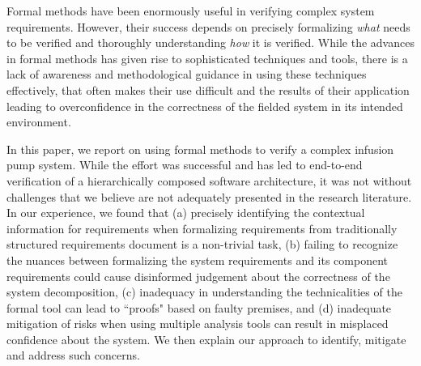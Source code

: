 Formal methods have been enormously useful in verifying complex system requirements. However, their success depends on precisely formalizing {\em what} needs to be verified and thoroughly understanding {\em how} it is verified. While the advances in formal methods has given rise to sophisticated techniques and tools, there is a lack of awareness and methodological guidance in using these techniques effectively, that often makes their use difficult and the results of their application leading to overconfidence in the correctness of the fielded system in its intended environment.

In this paper, we report on using formal methods to verify a complex infusion pump system.  While the effort was successful and has led to end-to-end verification of a hierarchically composed software architecture, it was not without challenges that we believe are not adequately presented in the research literature. In our experience, we found that (a) precisely identifying the contextual information for requirements when formalizing requirements from traditionally structured requirements document is a non-trivial task, (b) failing to recognize the nuances between formalizing the system requirements and its component requirements could cause disinformed judgement about the correctness of the system decomposition, (c) inadequacy in understanding the technicalities of the formal tool can lead to ``proofs" based on faulty premises, and (d) inadequate mitigation of risks when using multiple analysis tools can result in misplaced confidence about the system. We then explain our approach to identify, mitigate and address such concerns.


